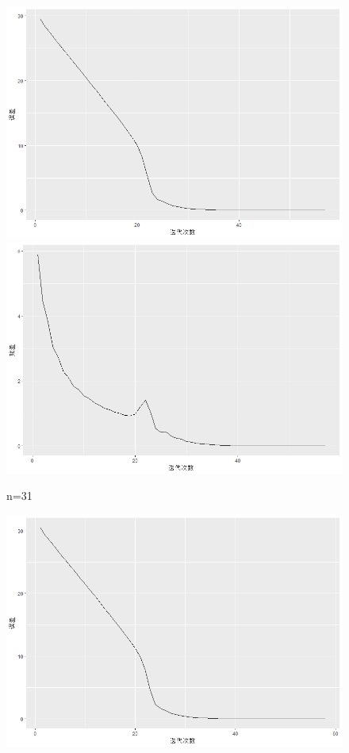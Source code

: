 \documentclass[10pt]{article}
\begin{document}
\begin{enumerate}
\begin{enumerate}
\begin{figure}[H]
  \centering
  \includegraphics[width=.9\textwidth]{6-a-311.png}
  \includegraphics[width=.9\textwidth]{6-a-312.png}
  \caption{n=31}
  \end{figure}
 \begin{figure}[H]
  \centering
  \includegraphics[width=.9\textwidth]{6-a-321.png}

\end{figure}
\end{enumerate}
\end{enumerate}
\end{document}
